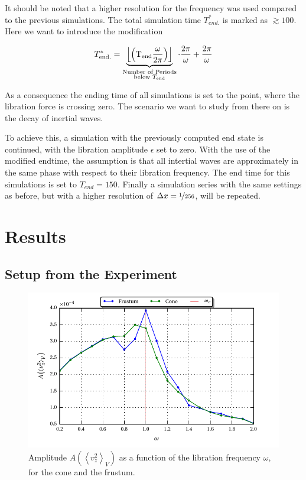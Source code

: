 It should be noted that a higher resolution for the frequency was used compared to the previous simulations.
The total simulation time $T^*_{end.}$ is marked as $\gtrsim 100$. Here we want to introduce the modification

\begin{align}
    T_{\text{end.}}^* = \underbrace{\Bigl\lfloor\left(\text{T}_{\text{end}}\frac{\omega}{2\pi}\right)\Bigr\rfloor}_
    {\substack{
        \text{Number of Periods}\\\text{below } T_{\text{end}}
        }}
    \cdot
        \frac{2\pi}{\omega} + \frac{2\pi}{\omega}
\end{align}

As a consequence the ending time  of all simulations is set to the point, where the libration force is crossing zero.
The scenario we want to study from there on is the decay of inertial waves.

To achieve this, a simulation with the previously computed end state is continued,
with the libration amplitude $\epsilon$ set to zero.
With the use of the modified endtime, the assumption is that all intertial waves are
approximately in the same phase with respect to their libration frequency.
The end time for this simulations is set to  $T_{end} = 150$.
Finally a simulation series with the same settings as before,
but with a higher resolution of $\Delta x = \nicefrac{1}{256}$, will be repeated.

\clearpage

\section{Results}
\subsection{Setup from the Experiment}
\label{cone:exp}

\begin{figure}[!bp]
  \centering
  \includegraphics{gfx/cone/experiment/experiment.pdf}
  \caption{Amplitude $A\left(\left<v^2_z\right>_V\right)$ as a function of the libration frequency $\omega$,
            for the cone and the frustum.  \label{fig:cone_expseries} }
\end{figure}

